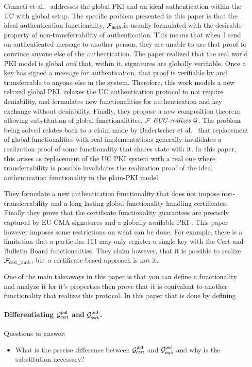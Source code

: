 Canneti et al.~\cite{uc-pki} addresses the global PKI and an ideal authentication within the UC with global setup.
The specific problem presented in this paper is that the ideal authentication functionality, $\mathcal{F}_{{\mathsf {auth}}}$,is usually formulated with the desirable property of non-transferrability of authentication.
This means that when I send an authenticated message to another person, they are unable to use that proof to convince anyone else of the authentication.
The paper realized that the real world PKI model is global \emph{and} that, within it, signatures are globally verifiable.
Once a key has signed a message for authentication, that proof is verifiable by and transferrable to anyone else in the system.
Therefore, this work models a new relaxed global PKI, relaxes the UC authentication protocol to not require deniability, and formulates new functionalities for authentication and key exchange without deniability.
Finally, they propose a new composition theorem allowing substitution of global functionalitites, $\mathcal{F} \textit{ EUC-realizes } \mathcal{G}$.
The problem being solved relates back to a claim made by Badertscher et al.~\cite{badertscher2017bitcoin} that replacement of global functionalities with real implementations generally invalidates a realization proof of some functionality that shares state with it. 
In this paper, this arises as replacement of the UC PKI system with a real one where transferrability is possible invalidates the realization proof of the ideal authentication functionality in the plain-PKI model.

They formulate a new authentication functionality that does not impose non-transferrability and a long lasting global functionality handling certificates.
Finally they prove that the certificate functionality guarantees are precisely captured by EU-CMA signatures and a globally-available PKI .
This paper however imposes some restrictions on what can be done.
For example, there is a limitation that a particular ITI may only register a single key with the Cert and Bulletin Board functionalities.
They claim however, that it is possible to realize $\mathcal{F}_{{\mathsf {cert\_auth}}}$, but a certificate-based approach is not it.

One of the main takeaways in this paper is that you can define a functionality and analyze it for it's properties then prove that it is equivalent to another functionality that realizes this protocol. 
In this paper that is done by defining

\paragraph{Differentiating $\mathcal{G}_{{\mathsf {cert}}}^{{\mathsf {pid}}}$ and $\mathcal{G}_{{\mathsf {swk}}}^{{\mathsf {pid}}}$.}




Questions to answer:
\begin{itemize}
\item What is the precise difference between $\mathcal{G}_{{\mathsf {cert}}}^{{\mathsf {pid}}}$ and $\mathcal{G}_{{\mathsf {cwk}}}^{{\mathsf {pid}}}$ and why is the substitution necessary?
\end{itemize}


